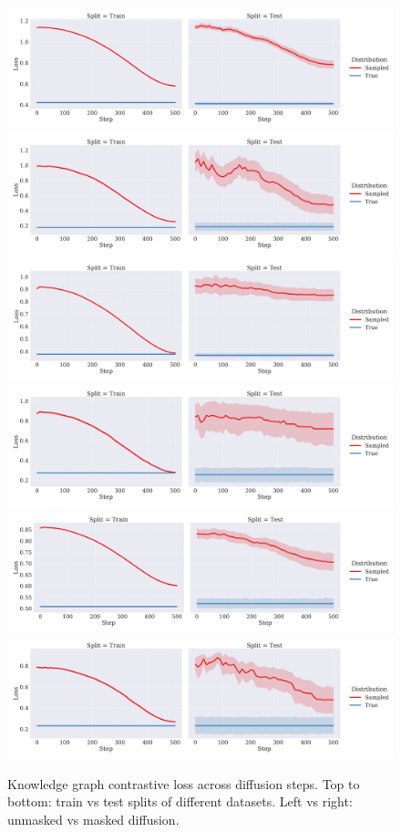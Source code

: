 \begin{figure}[H]
    \centering
    \includegraphics[width=0.49\linewidth]{figures/kg_generation/chain_likelihood_freebase.pdf}
    \hfill
    \includegraphics[width=0.49\linewidth]{figures/kg_generation/chain_likelihood_freebase_masked.pdf}
    \includegraphics[width=0.49\linewidth]{figures/kg_generation/chain_likelihood_wordnet.png}
    \hfill
    \includegraphics[width=0.49\linewidth]{figures/kg_generation/chain_likelihood_wordnet_masked.pdf}
    \includegraphics[width=0.49\linewidth]{figures/kg_generation/chain_likelihood_nell.pdf}
    \hfill
    \includegraphics[width=0.49\linewidth]{figures/kg_generation/chain_likelihood_nell_masked.pdf}
    \caption[Knowledge graph contrastive loss across diffusion steps.]{Knowledge graph contrastive loss across diffusion steps. Top to bottom: train vs test splits of different datasets. Left vs right: unmasked vs masked diffusion.}
    \label{fig:kg_diffusion_loss}
\end{figure}

